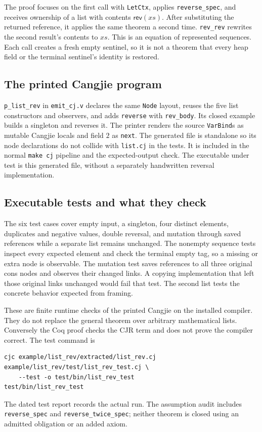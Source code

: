 \documentclass[11pt]{article}
\begin{document}
The proof focuses on the first call with \texttt{LetCtx}, applies
\texttt{reverse\_spec}, and receives ownership of a list with contents
\(\mathsf{rev}(xs)\). After substituting the returned reference, it applies the
same theorem a second time. \texttt{rev\_rev} rewrites the second result's
contents to \(xs\). This is an equation of represented sequences.
Each call creates a fresh empty sentinel, so it is not a theorem that every
heap field or the terminal sentinel's identity is restored.

\subsection{The printed Cangjie program}



\texttt{p\_list\_rev} in \texttt{emit\_cj.v} declares the same \texttt{Node}
layout, reuses the five list constructors and observers, and adds
\texttt{reverse} with \texttt{rev\_body}. Its closed example builds a singleton
and reverses it. The printer renders the source \texttt{VarBind}s as mutable
Cangjie locals and field \(2\) as \texttt{next}. The generated file is standalone
so its node declarations do not collide with \texttt{list.cj} in the tests.
It is included in the normal \texttt{make cj} pipeline and the expected-output
check. The executable under test is this generated file, without a separately
handwritten reversal implementation.

\subsection{Executable tests and what they check}



The six test cases cover empty input, a singleton, four distinct elements,
duplicates and negative values, double reversal, and mutation through saved
references while a separate list remains unchanged. The nonempty sequence
tests inspect every expected element and check the terminal empty tag, so a
missing or extra node is observable. The mutation test saves references to all
three original cons nodes and observes their changed links. A copying
implementation that left those original links unchanged would fail that test.
The second list tests the concrete behavior expected from framing.

These are finite runtime checks of the printed Cangjie on the installed
compiler. They do not replace the general theorem over arbitrary mathematical
lists. Conversely the Coq proof checks the CJR term and does not prove the
compiler correct. The test command is
\begin{lstlisting}
cjc example/list_rev/extracted/list_rev.cj example/list_rev/test/list_rev_test.cj \
    --test -o test/bin/list_rev_test
test/bin/list_rev_test
\end{lstlisting}
The dated test report records the actual run. The assumption audit includes
\texttt{reverse\_spec} and \texttt{reverse\_twice\_spec}; neither theorem is
closed using an admitted obligation or an added axiom.
\end{document}
